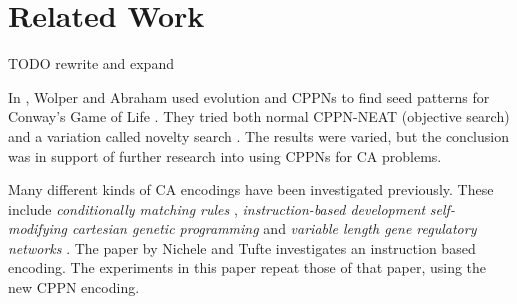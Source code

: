 \chapter{Related Work}
TODO rewrite and expand

In \cite{wolper-2015}, Wolper and Abraham used evolution and CPPNs to find seed patterns for Conway's Game of Life \cite{berlekamp1982winning}.
They tried both normal CPPN-NEAT (objective search) and a variation called novelty search \cite{lehman-2008}.
The results were varied, but the conclusion was in support of further research into using CPPNs for CA problems.

Many different kinds of CA encodings have been investigated previously.
These include \textit{conditionally matching rules} \cite{bidlo2013evolution, bidlo2015investigation, bidlo2015routine},
\textit{instruction-based development} \cite{bidlo2008instruction, bidlo2012evolution, nichele2016genotype,nichele2014evolutionary,nichele2016evolutionary}
\textit{self-modifying cartesian genetic programming} \cite{harding2011self}
and \textit{variable length gene regulatory networks} \cite{trefzer2013advantages}.
The paper \cite{nichele2014evolutionary} by Nichele and Tufte investigates an instruction based encoding.
The experiments in this paper repeat those of that paper, using the new CPPN encoding.

